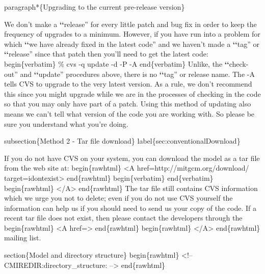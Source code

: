 \documentclass[letterpaper,10pt,english]{sphinxmanual}
\begin{document}
paragraph*\{Upgrading to the current pre-release version\}

We don't make a {\color{red}\bfseries{}{}`{}`}release'' for every little patch and bug fix in
order to keep the frequency of upgrades to a minimum. However, if you
have run into a problem for which {\color{red}\bfseries{}{}`{}`}we have already fixed in the
latest code'' and we haven't made a {\color{red}\bfseries{}{}`{}`}tag'' or {\color{red}\bfseries{}{}`{}`}release'' since that
patch then you'll need to get the latest code:
begin\{verbatim\}
\% cvs -q update -d -P -A
end\{verbatim\}
Unlike, the {\color{red}\bfseries{}{}`{}`}check-out'' and {\color{red}\bfseries{}{}`{}`}update'' procedures above, there is no
{\color{red}\bfseries{}{}`{}`}tag'' or release name. The -A tells CVS to upgrade to the
very latest version. As a rule, we don't recommend this since you
might upgrade while we are in the processes of checking in the code so
that you may only have part of a patch. Using this method of updating
also means we can't tell what version of the code you are working
with. So please be sure you understand what you're doing.

subsection\{Method 2 - Tar file download\}
label\{sec:conventionalDownload\}

If you do not have CVS on your system, you can download the model as a
tar file from the web site at:
begin\{rawhtml\} \textless{}A href=http://mitgcm.org/download/ target=\sphinxquotedblright{}idontexist\sphinxquotedblright{}\textgreater{} end\{rawhtml\}
begin\{verbatim\}
end\{verbatim\}
begin\{rawhtml\} \textless{}/A\textgreater{} end\{rawhtml\}
The tar file still contains CVS information which we urge you not to
delete; even if you do not use CVS yourself the information can help
us if you should need to send us your copy of the code.  If a recent
tar file does not exist, then please contact the developers through
the
begin\{rawhtml\} \textless{}A href=\sphinxquotedblright{}\sphinxquotedblleft{}\textgreater{} end\{rawhtml\}
begin\{rawhtml\} \textless{}/A\textgreater{} end\{rawhtml\}
mailing list.

section\{Model and directory structure\}
begin\{rawhtml\}
\textless{}!-- CMIREDIR:directory\_structure: --\textgreater{}
end\{rawhtml\}
\end{document}

